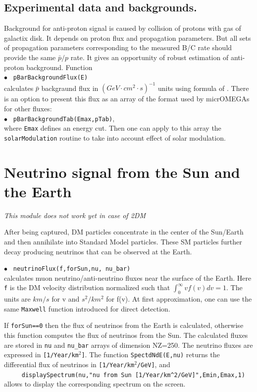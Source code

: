 \documentclass[12pt,a4paper]{article}
\begin{document}
\subsection{Experimental data and backgrounds.}
Background  for  anti-proton  signal  is caused by  collision of protons with gas of
galactix disk. It depends on proton flux and propagation parameters. 
But all sets of  propagation parameters corresponding  to the measured  
B/C rate should provide the same $\bar{p}/p$ rate. It gives an opportunity of
robust estimation of anti-proton background. Function\\
$\bullet$ \verb| pBarBackgroundFlux(E)|\\
calculates $\bar{p}$ backgraund flux in $(GeV\cdot cm^2 \cdot s)^{-1}$ units
using formula of \cite{Maurin:2006hy}. There is an option to present this flux as 
an array of the format used by  micrOMEGAs for other fluxes: \\
 $\bullet$ \verb| pBarBackgroundTab(Emax,pTab)|,\\
where {\tt Emax} defines  an energy  cut. 
Then one can apply to this array the {\tt solarModulation} routine to take into 
account effect of solar modulation.


\section{Neutrino signal from the Sun and the Earth }
\label{sec:neutrino}

\begin{center}
{\it This module
does not work yet in case of 2DM}
\end{center}

After being captured, DM particles concentrate in the center of the Sun/Earth and 
then  annihilate into Standard Model particles. These SM particles further decay producing neutrinos that can be 
observed at the Earth.   

\noindent
$\bullet$ \verb| neutrinoFlux(f,forSun,nu, nu_bar)|\\
calculates muon neutrino/anti-neutrino  fluxes  near the surface of the Earth. 
Here  \verb|f|  is  the DM velocity distribution   normalized such that 
$ \int_0^{\infty} v f(v) dv =1$. The units  are $km/s$ for v and $s^2/km^2$ for  
f(v). At first approximation,   one can use the same  \verb|Maxwell| 
function introduced for direct detection.
  
  If {\tt forSun==0} then the flux of neutrinos from the Earth is calculated, otherwise this function computes the flux of neutrinos from the Sun.  The calculated fluxes are stored in {\tt nu} and {\tt nu\_bar}  arrays of dimension NZ=250.  
The neutrino fluxes are expressed in \verb|[1/Year/km|$^2$\verb|]|.
 The function
{\tt SpectdNdE(E,nu)} returns the differential flux of neutrinos in 
\verb|[1/Year/km|$^2$\verb|/GeV]|, and \\
\verb|     displaySpectrum(nu,"nu from Sun [1/Year/km^2/GeV]",Emin,Emax,1)|\\
allows to display the corresponding spectrum on the screen.    
\end{document}
